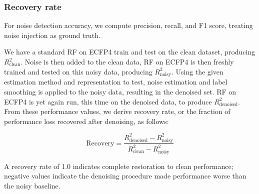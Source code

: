 \subsubsection{Recovery rate}

For noise detection accuracy, we compute precision, recall, and F1 score, treating noise injection as ground truth.

We have a standard RF on ECFP4 train and test on the clean dataset, producing $R^2_{\text{clean}}$. Noise is then added to the clean data, RF on ECFP4 is then freshly trained and tested on this noisy data, producing $R^2_{\text{noisy}}$. Using the given estimation method and representation to test, noise estimation and label smoothing is applied to the noisy data, resulting in the denoised set. RF on ECFP4 is yet again run, this time on the denoised data, to produce $R^2_{\text{denoised}}$. From these performance values, we derive recovery rate, or the fraction of performance loss recovered after denoising, as follows: 

$$
\text{Recovery} = \frac{R^2_{\text{denoised}} - R^2_{\text{noisy}}}{R^2_{\text{clean}} - R^2_{\text{noisy}}}
$$

A recovery rate of 1.0 indicates complete restoration to clean performance; negative values indicate the denoising procedure made performance worse than the noisy baseline.


